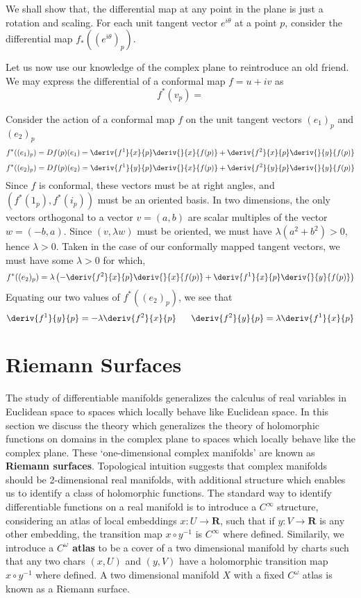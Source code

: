 We shall show that, the differential map at any point in the plane is just a rotation and scaling. For each unit tangent vector $e^{i\theta}$ at a point $p$, consider the differential map $f_*((e^{i\theta})_p)$.

Let us now use our knowledge of the complex plane to reintroduce an old friend. We may express the differential of a conformal map $f = u + iv$ as
%
\[ f^*(v_p) = \]

Consider the action of a conformal map $f$ on the unit tangent vectors $(e_1)_p$ and $(e_2)_p$
%
\[ f^*((e_1)_p) = Df(p)(e_1) = \deriv{f^1}{x}{p} \deriv{}{x}{f(p)} + \deriv{f^2}{x}{p} \deriv{}{y}{f(p)} \]
%
\[ f^*((e_2)_p) = Df(p)(e_2) = \deriv{f^1}{y}{p} \deriv{}{x}{f(p)} + \deriv{f^2}{y}{p} \deriv{}{y}{f(p)} \]
%
Since $f$ is conformal, these vectors must be at right angles, and $(f^*(1_p), f^*(i_p))$ must be an oriented basis. In two dimensions, the only vectors orthogonal to a vector $v = (a,b)$ are scalar multiples of the vector $w = (-b,a)$. Since $(v, \lambda w)$ must be oriented, we must have $\lambda (a^2 + b^2) > 0$, hence $\lambda > 0$. Taken in the case of our conformally mapped tangent vectors, we must have some $\lambda > 0$ for which,
%
\[ f^*((e_2)_p) = \lambda \left( -\deriv{f^2}{x}{p} \deriv{}{x}{f(p)} + \deriv{f^1}{x}{p} \deriv{}{y}{f(p)} \right) \]
%
Equating our two values of $f^*((e_2)_p)$, we see that
%
\[ \deriv{f^1}{y}{p} = - \lambda \deriv{f^2}{x}{p}\ \ \ \ \ \deriv{f^2}{y}{p} = \lambda \deriv{f^1}{x}{p} \]











\chapter{Riemann Surfaces}

The study of differentiable manifolds generalizes the calculus of real variables in Euclidean space to spaces which locally behave like Euclidean space. In this section we discuss the theory which generalizes the theory of holomorphic functions on domains in the complex plane to spaces which locally behave like the complex plane. These `one-dimensional complex manifolds' are known as {\bf Riemann surfaces}. Topological intuition suggests that complex manifolds should be 2-dimensional real manifolds, with additional structure which enables us to identify a class of holomorphic functions. The standard way to identify differentiable functions on a real manifold is to introduce a $C^\infty$ structure, considering an atlas of local embeddings $x: U \to \mathbf{R}$, such that if $y: V \to \mathbf{R}$ is any other embedding, the transition map $x \circ y^{-1}$ is $C^\infty$ where defined. Similarily, we introduce a {\bf $C^\omega$ atlas} to be a cover of a two dimensional manifold by charts such that any two chars $(x,U)$ and $(y,V)$ have a holomorphic transition map $x \circ y^{-1}$ where defined. A two dimensional manifold $X$ with a fixed $C^\omega$ atlas is known as a Riemann surface.

